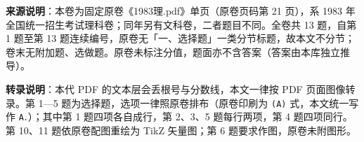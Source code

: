 

\begin{gktip}
\textbf{来源说明}：本卷为固定原卷《1983理.pdf》单页（原卷页码第 21 页），系 1983 年全国统一招生考试理科卷；同年另有文科卷，二者题目不同。全卷共 13 题，自第 1 题至第 13 题连续编号，原卷无「一、选择题」一类分节标题，故本文不分节；卷末无附加题、选做题。原卷未标注分值，题面亦不含答案（答案由本库独立推导）。

\textbf{转录说明}：本代 PDF 的文本层会丢根号与分数线，本文一律按 PDF 页面图像转录。第 1—5 题为选择题，选项一律照原卷排布（原卷印刷为 \texttt{(A)} 式，本文统一写作 \texttt{A．}）；其中第 1 题四项各自成行，第 2、3、5 题每行两项，第 4 题四项同行。第 10、11 题依原卷配图重绘为 TikZ 矢量图；第 6 题要求作图，原卷未附图形。
\end{gktip}

